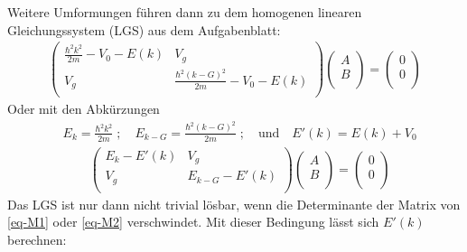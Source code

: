 Weitere Umformungen führen dann zu dem homogenen linearen Gleichungssystem (LGS)
aus dem Aufgabenblatt:
\begin{align}
\label{eq-M1}
\begin{pmatrix}
\frac{\hbar^2k^2}{2m}-V_0-E(k) & V_g\\
V_g & \frac{\hbar^2(k-G)^2}{2m}-V_0-E(k)\\
\end{pmatrix}
\begin{pmatrix}
A\\ B\\
\end{pmatrix}
= \begin{pmatrix}
0\\ 0\\
\end{pmatrix}
\end{align}
Oder mit den Abkürzungen
\begin{align*}
& E_{k} = \frac{\hbar^2k^2}{2m}\; ; \quad E_{k-G} = \frac{\hbar^2(k-G)^2}{2m}\; ;
\quad \text{und}\quad E'(k)=E(k) +V_0
\end{align*}
\begin{align}
&\begin{pmatrix}
\label{eq-M2}
E_k-E'(k) & V_g\\
V_g & E_{k-G}-E'(k)\\
\end{pmatrix}
\begin{pmatrix}
A\\ B\\
\end{pmatrix}
= \begin{pmatrix}
0\\ 0\\
\end{pmatrix}
\end{align}
Das LGS ist nur dann nicht trivial lösbar, wenn die Determinante der Matrix
von \eqref{eq-M1} oder \eqref{eq-M2} verschwindet. Mit dieser Bedingung lässt
sich $E'(k)$ berechnen:

